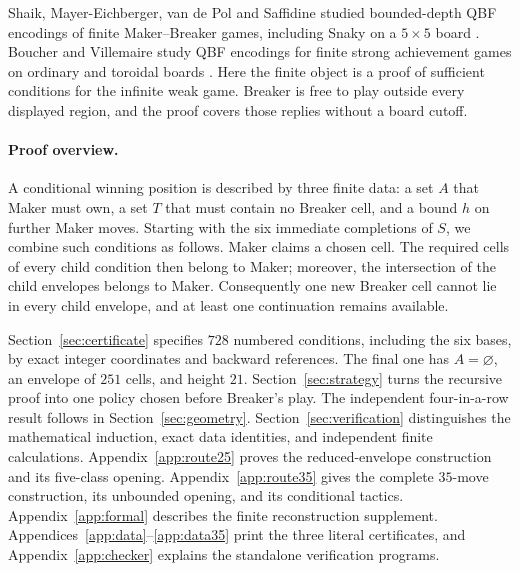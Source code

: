 Shaik, Mayer-Eichberger, van de Pol and Saffidine studied bounded-depth
QBF encodings of finite Maker--Breaker games, including Snaky on a
$5\times5$ board \cite[Sections~2.1 and~6]{ShaikEtAl2023}.
Boucher and Villemaire study QBF encodings for finite strong achievement
games on ordinary and toroidal boards
\cite[Sections~2.2, 3.3--3.4, and~4]{BoucherVillemaire2025}.
Here the finite object is a proof of sufficient conditions for the
infinite weak game. Breaker is free to play outside every displayed
region, and the proof covers those replies without a board cutoff.

\paragraph{Proof overview.}
A conditional winning position is described by three finite data:
a set $A$ that Maker must own, a set $T$ that must contain no Breaker
cell, and a bound $h$ on further Maker moves. Starting with the six
immediate completions of $S$, we combine such conditions as follows.
Maker claims a chosen cell. The required cells of every child
condition then belong to Maker; moreover, the intersection of the
child envelopes belongs to Maker. Consequently one new Breaker cell
cannot lie in every child envelope, and at least one continuation
remains available.

Section~\ref{sec:certificate} specifies $728$ numbered conditions,
including the six bases, by exact integer coordinates and backward
references. The final one has $A=\varnothing$, an envelope of $251$
cells, and height $21$. Section~\ref{sec:strategy} turns the recursive
proof into one policy chosen before Breaker's play. The independent
four-in-a-row result follows in Section~\ref{sec:geometry}.
Section~\ref{sec:verification} distinguishes the mathematical induction,
exact data identities, and independent finite calculations.
Appendix~\ref{app:route25} proves the reduced-envelope construction and
its five-class opening. Appendix~\ref{app:route35} gives the complete
$35$-move construction, its unbounded opening, and its conditional tactics.
Appendix~\ref{app:formal} describes the finite reconstruction supplement.
Appendices~\ref{app:data}--\ref{app:data35}
print the three literal certificates, and Appendix~\ref{app:checker}
explains the standalone verification programs.
